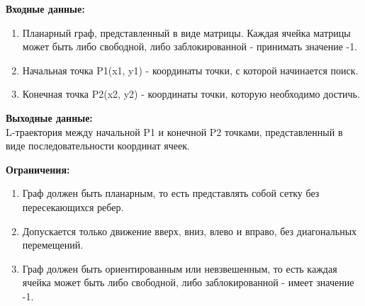 \documentclass[a4paper, 12pt]{article}
\begin{document}
    \textbf{Входные данные:}
    \begin{enumerate}
        \item Планарный граф, представленный в виде матрицы. Каждая ячейка матрицы может быть либо свободной, либо заблокированной - принимать значение -1.
        \item Начальная точка P1(x1, y1) - координаты точки, с которой начинается поиск.
        \item Конечная точка P2(x2, y2) - координаты точки, которую необходимо достичь.
    \end{enumerate}
    
    \textbf{Выходные данные:} \\
    L-траектория между начальной P1 и конечной P2 точками, представленный в виде последовательности координат ячеек.
    
    \textbf{Ограничения:}
    \begin{enumerate}
        \item Граф должен быть планарным, то есть представлять собой сетку без пересекающихся ребер.
        \item Допускается только движение вверх, вниз, влево и вправо, без диагональных перемещений.
        \item Граф должен быть ориентированным или невзвешенным, то есть каждая ячейка может быть либо свободной, либо заблокированной - имеет значение -1.
    \end{enumerate} 
    
\end{document}
